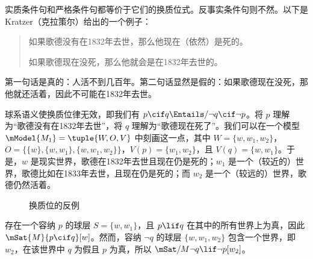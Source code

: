 \documentclass[../../../include/open-logic-section]{subfiles}
\begin{document}


实质条件句和严格条件句都等价于它们的换质位式。反事实条件句则不然。以下是 Kratzer（克拉策尔）给出的一个例子：
\begin{quote}
  如果歌德没有在1832年去世，那么他现在（依然）是死的。

  如果歌德现在没死，那么他就会是在1832年去世的。
\end{quote}
第一句话是真的：人活不到几百年。第二句话显然是假的：如果歌德现在没死，那他就还活着，因此不可能在1832年去世。

\begin{ex}
  球系语义使换质位律无效，即我们有 $p \cif q \Entails/ \lnot q \cif \lnot p$。将 $p$ 理解为“歌德没有在1832年去世”，将 $q$ 理解为“歌德现在死了”。我们可以在一个模型 $\mModel{M_1} = \tuple{W, O, V}$ 中刻画这一点，其中 $W =
  \{w, w_1, w_2\}$，$O = \{\{w\}, \{w, w_1\}, \{w, w_1, w_2\}\}$，$V(p) = \{w_1, w_2\}$，且 $V(q) = \{w, w_1\}$。于是，$w$ 是现实世界，歌德在1832年去世且现在仍是死的；$w_1$ 是一个（较近的）世界，歌德比如在1833年去世，且现在仍是死的；而 $w_2$ 是一个（较远的）世界，歌德仍然活着。
\begin{figure}
\begin{center}
\caption{换质位的反例}
\end{center}
\end{figure}
存在一个容纳 $p$ 的球层 $S =
\{w, w_1\}$，且 $p \lif q$ 在其中的所有世界上为真，因此 $\mSat{M}{p
  \cif q}[w]$。然而，容纳 $\lnot q$ 的球层 $\{w, w_1,
w_2\}$ 包含一个世界，即~$w_2$，在该世界中 $q$ 为假且 $p$ 为真，所以 $\mSat/{M}{\lnot q \lif \lnot p}[w_2]$。
\end{ex}
\end{document}
